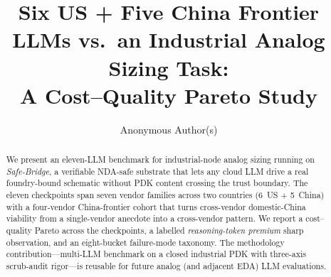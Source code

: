 \documentclass[sigconf,anonymous,nonacm,review]{acmart}
\title{Six US + Five China Frontier LLMs vs.\ an Industrial Analog Sizing Task:\\
A Cost--Quality Pareto Study}
\author{Anonymous Author(s)}
\affiliation{%
  \institution{Submission \#TBD}
  \city{}\country{}}
\begin{document}
\begin{abstract}
We present an eleven-LLM benchmark for industrial-node analog sizing
running on \emph{Safe-Bridge}, a verifiable NDA-safe substrate that
lets any cloud LLM drive a real foundry-bound schematic without PDK
content crossing the trust boundary. The eleven checkpoints span
seven vendor families across two countries (6~US + 5~China) with a
four-vendor China-frontier cohort that turns cross-vendor
domestic-China viability from a single-vendor anecdote into a
cross-vendor pattern. We report a cost--quality Pareto across the
checkpoints, a labelled \emph{reasoning-token premium} sharp
observation, and an eight-bucket failure-mode taxonomy. The
methodology contribution---multi-LLM benchmark on a closed
industrial PDK with three-axis scrub-audit rigor---is reusable for
future analog (and adjacent EDA) LLM evaluations.
\end{abstract}


\maketitle












\end{document}
